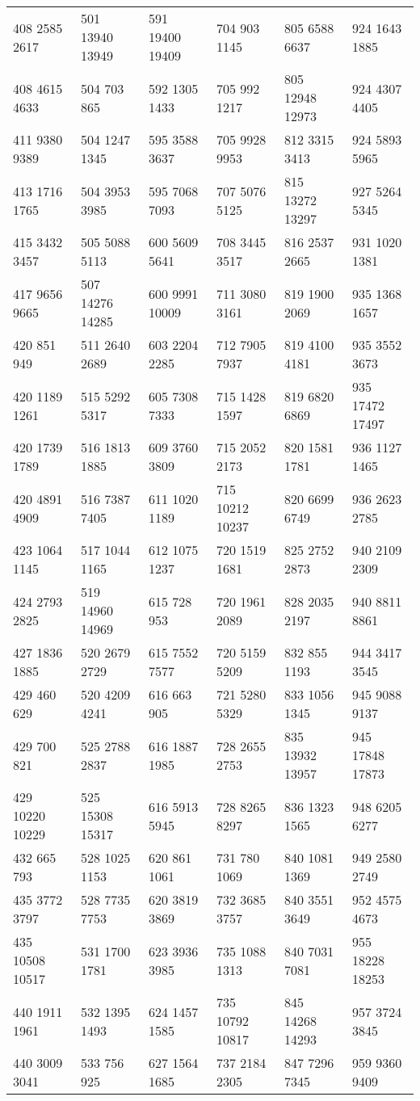 \begin{center}
\begin{longtable}[c]{llllll}
408 2585 2617&501 13940 13949&591 19400 19409&704 903 1145&805 6588 6637&924 1643 1885\\
408 4615 4633&504 703 865&592 1305 1433&705 992 1217&805 12948 12973&924 4307 4405\\
411 9380 9389&504 1247 1345&595 3588 3637&705 9928 9953&812 3315 3413&924 5893 5965\\
413 1716 1765&504 3953 3985&595 7068 7093&707 5076 5125&815 13272 13297&927 5264 5345\\
415 3432 3457&505 5088 5113&600 5609 5641&708 3445 3517&816 2537 2665&931 1020 1381\\
417 9656 9665&507 14276 14285&600 9991 10009&711 3080 3161&819 1900 2069&935 1368 1657\\
420 851 949&511 2640 2689&603 2204 2285&712 7905 7937&819 4100 4181&935 3552 3673\\
420 1189 1261&515 5292 5317&605 7308 7333&715 1428 1597&819 6820 6869&935 17472 17497\\
420 1739 1789&516 1813 1885&609 3760 3809&715 2052 2173&820 1581 1781&936 1127 1465\\
420 4891 4909&516 7387 7405&611 1020 1189&715 10212 10237&820 6699 6749&936 2623 2785\\
423 1064 1145&517 1044 1165&612 1075 1237&720 1519 1681&825 2752 2873&940 2109 2309\\
424 2793 2825&519 14960 14969&615 728 953&720 1961 2089&828 2035 2197&940 8811 8861\\
427 1836 1885&520 2679 2729&615 7552 7577&720 5159 5209&832 855 1193&944 3417 3545\\
429 460 629&520 4209 4241&616 663 905&721 5280 5329&833 1056 1345&945 9088 9137\\
429 700 821&525 2788 2837&616 1887 1985&728 2655 2753&835 13932 13957&945 17848 17873\\
429 10220 10229&525 15308 15317&616 5913 5945&728 8265 8297&836 1323 1565&948 6205 6277\\
432 665 793&528 1025 1153&620 861 1061&731 780 1069&840 1081 1369&949 2580 2749\\
435 3772 3797&528 7735 7753&620 3819 3869&732 3685 3757&840 3551 3649&952 4575 4673\\
435 10508 10517&531 1700 1781&623 3936 3985&735 1088 1313&840 7031 7081&955 18228 18253\\
440 1911 1961&532 1395 1493&624 1457 1585&735 10792 10817&845 14268 14293&957 3724 3845\\
440 3009 3041&533 756 925&627 1564 1685&737 2184 2305&847 7296 7345&959 9360 9409\\

\end{longtable}
\end{center}
